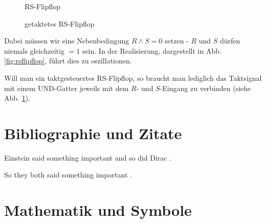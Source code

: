 \documentclass[12pt, a4paper, twopage]{scrartcl}
\begin{document}
\begin{figure}[h!]
\centering
  \centering
    \caption{RS-Flipflop}%
    \label{fig:rsflipflop}
  \endminipage\hspace{1cm}   
%
	\centering
    \caption{getaktetes RS-Flipflop}%
    \label{fig:rsflipfloptakt}
  \endminipage
\end{figure}

Dabei müssen wir eine Nebenbedingung $R \wedge S = 0$ setzen - $R$ und $S$ dürfen niemals gleichzeitig $= 1$ sein. In der Realisierung, dargestellt in Abb. \ref{fig:rsflipflop}, führt dies zu oszillationen. 

Will man ein taktgesteuertes RS-Flipflop, so braucht man lediglich das Taktsignal mit einem UND-Gatter jeweils mit dem $R$- und $S$-Eingang zu verbinden (siehe Abb. \ref{fig:rsflipfloptakt}).














\section{Bibliographie und Zitate}
Einstein said something important\cite{einstein} and so did Dirac \cite{dirac}.

So they both said something important \cite{dirac,einstein}.


\section{Mathematik und Symbole}
\end{document}
